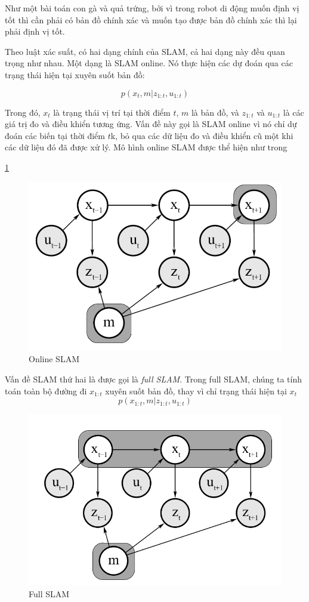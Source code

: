 Như một bài toán con gà và quả trứng, bởi vì trong robot di động muốn định vị tốt thì cần phải có bản đồ chính xác và muốn tạo được bản đồ chính xác thì lại phải định vị tốt.

Theo luật xác suất, có hai dạng chính của SLAM, cả hai dạng này đều quan trọng như nhau. Một dạng là SLAM online. Nó thực hiện các dự đoán qua các trạng thái hiện tại xuyên suốt bản đồ:

\begin{equation}
  p\left({x}_{t}, m | {z}_{1:t}, {u}_{1:t}\right)
\end{equation}

Trong đó, ${x}_{t}$ là trạng thái vị trí tại thời điểm $t$, $m$ là bản đồ, và ${z}_{1:t}$ và ${u}_{1:t}$ là các giá trị đo và điều khiển tương ứng. Vấn đề này gọi là SLAM online vì nó chỉ dự đoán các biến tại thời điểm $t$k, bỏ qua các dữ liệu đo và điều khiển cũ một khi các dữ liệu đó đã được xử lý. Mô hình online SLAM được thể hiện như trong \figurename{\ref{fig:onlineSLAM}

\begin{figure}[htbp]
  \centering
  \includegraphics[width=0.6\linewidth]{figures/onlineSLAM.PNG}
  \caption{Online SLAM}
  \label{fig:onlineSLAM}
\end{figure}

Vấn đề SLAM thứ hai là được gọi là \textit{full SLAM}. Trong full SLAM, chúng ta tính toán toàn bộ đường đi ${x}_{1:t}$ xuyên suốt bản đồ, thay vì chỉ trạng thái hiện tại ${x}_{t}$
\begin{equation}
  p\left({x}_{1:t},m | {z}_{1:t}, {u}_{1:t}\right)
\end{equation}

\begin{figure}[htbp]
  \centering
  \includegraphics[width=0.6\linewidth]{figures/fullSLAM.png}
  \caption{Full SLAM}
  \label{fig:fullSLAM}
\end{figure}

}
